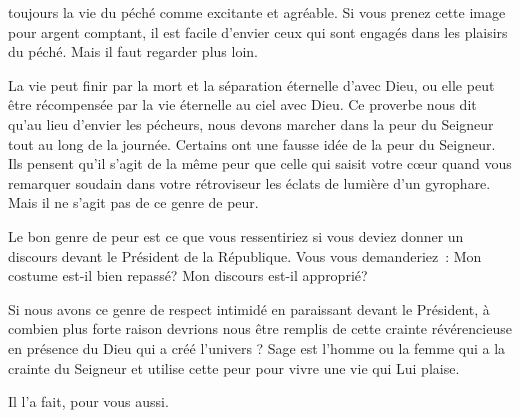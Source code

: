 



 toujours la vie du péché
 comme excitante et agréable.
 Si vous prenez cette image pour argent comptant,
 il est facile d'envier ceux qui sont engagés
 dans les plaisirs du péché. Mais il faut regarder plus loin. 


La vie peut finir par la mort et la séparation éternelle d'avec Dieu,
 ou elle peut être récompensée par la vie éternelle au ciel avec Dieu.
 Ce proverbe nous dit qu'au lieu d'envier les pécheurs,
 nous devons marcher dans la peur 
 du Seigneur tout au long de la journée.
 Certains ont une fausse idée de la peur du Seigneur.
 Ils pensent qu'il s'agit de la même peur que celle qui saisit votre cœur
 quand vous remarquer soudain dans votre rétroviseur les éclats de lumière
 d'un gyrophare. Mais il ne s'agit pas de ce genre de peur. 

Le bon genre de peur est ce que vous ressentiriez si vous deviez donner
 un discours devant le Président de la République.
 Vous vous demanderiez~: 
 \og Mon costume est-il bien repassé? 
 Mon discours est-il approprié? \fg{}

Si nous avons ce genre de respect intimidé en paraissant devant le Président,
 à combien plus forte raison devrions nous être remplis de cette crainte
 révérencieuse en présence du Dieu qui a créé l'univers ?
 Sage est l'homme ou la femme qui a la crainte du Seigneur
 \ocadr et utilise cette peur pour vivre une vie qui Lui plaise. 

Il l'a fait, pour vous aussi.

\dvrule





